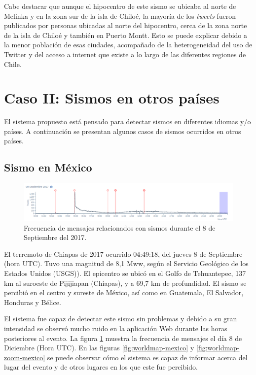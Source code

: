 	
Cabe destacar que aunque el hipocentro de este sismo se ubicaba al norte de Melinka y en la zona sur de la isla de Chiloé, la mayoría de los \textit{tweets} fueron publicados por personas ubicadas al norte del hipocentro, cerca de la zona norte de la isla de Chiloé y también en Puerto Montt. Esto se puede explicar debido a la menor población de esas ciudades, acompañado de la heterogeneidad del uso de Twitter y del acceso a internet que existe a lo largo de las diferentes regiones de Chile.
	

	\section{Caso II: Sismos en otros países}
	
	El sistema propuesto está pensado para detectar sismos en diferentes idiomas y/o países. A continuación se presentan algunos casos de sismos ocurridos en otros países.  
	
	\subsection{Sismo en México}
	
\begin{figure}[!h]
	  \centering
	  \includegraphics[width=\textwidth]{imagenes/img-sismo-mexico.png}
	  \caption{Frecuencia de mensajes relacionados con sismos durante el 8 de Septiembre del 2017.}
		\label{fig:timeline-mexico}
\end{figure}	
		
El terremoto de Chiapas de 2017 ocurrido 04:49:18, del jueves 8 de Septiembre (hora UTC). Tuvo una magnitud de 8,1 Mww, según el Servicio Geológico de los Estados Unidos (USGS)). El epicentro se ubicó en el Golfo de Tehuantepec, 137 km al suroeste de Pijijiapan (Chiapas), y a 69,7 km de profundidad. El sismo se percibió en el centro y sureste de México, así como en Guatemala, El Salvador, Honduras y Bélice.

	El sistema fue capaz de detectar este sismo sin problemas y debido a su gran intensidad se observó mucho ruido en la aplicación Web durante las horas posteriores al evento. La figura \ref{fig:timeline-mexico} muestra la frecuencia de mensajes el día 8 de Diciembre (Hora UTC). En las figuras \ref{fig:worldmap-mexico} y \ref{fig:worldmap-zoom-mexico} se puede observar cómo el sistema es capaz de informar acerca del lugar del evento y de otros lugares en los que este fue percibido. 
	
